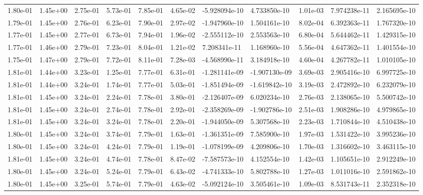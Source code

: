 \begin{longtable}{| p{} | p{} |}
1.80e-01 & 1.45e+00 & 2.75e-01 & 5.73e-01 & 7.85e-01 & 4.65e-02 & -5.928094e-10 &  4.733850e-10 &  1.01e-03 &  7.974238e-11 &  2.165695e-10 \\
1.79e-01 & 1.45e+00 & 2.76e-01 & 6.23e-01 & 7.90e-01 & 2.97e-02 & -1.947960e-10 &  1.504161e-10 &  8.02e-04 &  6.392363e-11 &  1.767320e-10 \\
1.77e-01 & 1.45e+00 & 2.77e-01 & 6.73e-01 & 7.94e-01 & 1.96e-02 & -2.555112e-10 &  2.553563e-10 &  6.80e-04 &  5.644462e-11 &  1.429315e-10 \\
1.77e-01 & 1.46e+00 & 2.79e-01 & 7.23e-01 & 8.04e-01 & 1.21e-02 &  7.208341e-11 &  1.168960e-10 &  5.56e-04 &  4.647362e-11 &  1.401554e-10 \\
1.75e-01 & 1.47e+00 & 2.79e-01 & 7.72e-01 & 8.11e-01 & 7.28e-03 & -4.568990e-11 &  3.184918e-10 &  4.60e-04 &  4.267782e-11 &  1.010105e-10 \\
1.81e-01 & 1.44e+00 & 3.23e-01 & 1.25e-01 & 7.77e-01 & 6.31e-01 & -1.281141e-09 & -1.907130e-09 &  3.69e-03 &  2.905416e-10 &  6.997725e-10 \\
1.81e-01 & 1.44e+00 & 3.24e-01 & 1.74e-01 & 7.77e-01 & 5.03e-01 & -1.851494e-09 & -1.619842e-10 &  3.19e-03 &  2.472892e-10 &  6.232079e-10 \\
1.81e-01 & 1.45e+00 & 3.24e-01 & 2.24e-01 & 7.78e-01 & 3.80e-01 & -2.126407e-09 &  6.020234e-10 &  2.76e-03 &  2.138065e-10 &  5.500742e-10 \\
1.81e-01 & 1.45e+00 & 3.24e-01 & 2.74e-01 & 7.78e-01 & 2.92e-01 & -2.358269e-09 & -1.902786e-10 &  2.51e-03 &  1.908286e-10 &  4.979865e-10 \\
1.81e-01 & 1.45e+00 & 3.24e-01 & 3.24e-01 & 7.78e-01 & 2.20e-01 & -1.944050e-09 &  5.307568e-10 &  2.23e-03 &  1.710844e-10 &  4.510438e-10 \\
1.80e-01 & 1.45e+00 & 3.24e-01 & 3.74e-01 & 7.79e-01 & 1.63e-01 & -1.361351e-09 &  7.585900e-10 &  1.97e-03 &  1.531422e-10 &  3.995236e-10 \\
1.80e-01 & 1.45e+00 & 3.24e-01 & 4.24e-01 & 7.79e-01 & 1.19e-01 & -1.078199e-09 &  4.209806e-10 &  1.70e-03 &  1.316602e-10 &  3.463115e-10 \\
1.81e-01 & 1.45e+00 & 3.24e-01 & 4.74e-01 & 7.78e-01 & 8.47e-02 & -7.587573e-10 &  4.152554e-10 &  1.42e-03 &  1.105651e-10 &  2.912249e-10 \\
1.80e-01 & 1.45e+00 & 3.24e-01 & 5.24e-01 & 7.79e-01 & 6.43e-02 & -4.741333e-10 &  5.802788e-10 &  1.27e-03 &  1.011016e-10 &  2.591862e-10 \\
1.80e-01 & 1.45e+00 & 3.25e-01 & 5.74e-01 & 7.79e-01 & 4.63e-02 & -5.092124e-10 &  3.505461e-10 &  1.09e-03 &  8.531743e-11 &  2.352318e-10 \\

\end{longtable}
